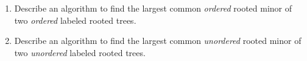 \begin{enumerate}[label=\arabic*.,ref=\thechapter.\arabic*,leftmargin=*,align=left,widest*=99,itemsep=1.5ex plus 0.5ex,resume]
\begin{enumerate}
Again, the left-to-right order of nodes in $M$ should be consistent with their order in $T$.
\item {} Describe an algorithm to find the largest common \textit{ordered} rooted minor of two \textit{ordered} labeled rooted trees.
\item {} Describe an algorithm to find the largest common \textit{unordered} rooted minor of two \textit{unordered} labeled rooted trees.
\end{enumerate}
\end{enumerate}
